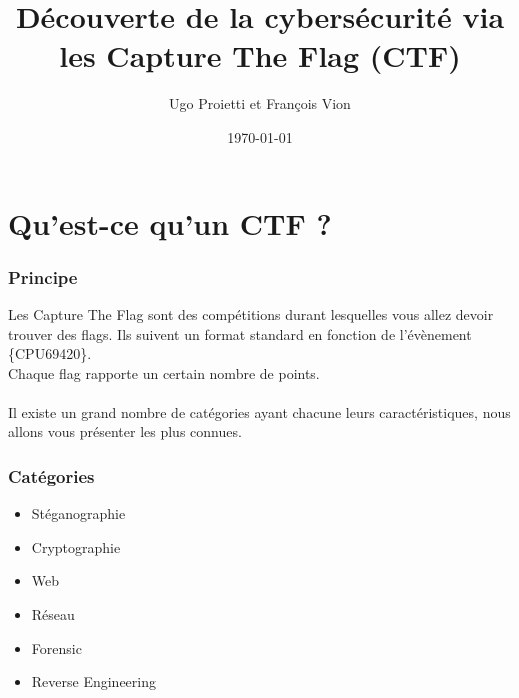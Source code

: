 \documentclass{beamer}
\title[Capture The Flag]{Découverte de la cybersécurité via les Capture The Flag (CTF)} %
\author{Ugo Proietti et François Vion} %
\institute[UMONS] %
{
Universtité de Mons \\ %
\medskip
}
\date{\today} %
\begin{document}
\begin{frame}
\titlepage %
\end{frame}

\begin{frame}
\frametitle{} %
\tableofcontents %
\end{frame}


\section{Qu'est-ce qu'un CTF ?} %

\begin{frame}\frametitle{Principe}

Les Capture The Flag sont des compétitions durant lesquelles vous allez devoir trouver des flags. Ils suivent un format standard en fonction de l'évènement \{CPU69420\}. \\
Chaque flag rapporte un certain nombre de points. \\~\\

Il existe un grand nombre de catégories ayant chacune leurs caractéristiques, nous allons vous présenter les plus connues.

\end{frame}


\begin{frame}\frametitle{Catégories}

\begin{itemize}
    \item Stéganographie
    \item Cryptographie
    \item Web
    \item Réseau
    \item Forensic
    \item Reverse Engineering
\end{itemize}

\end{frame}
\end{document}
